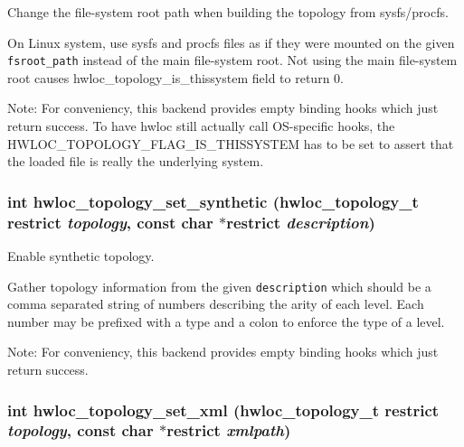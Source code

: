 Change the file-system root path when building the topology from sysfs/procfs. 

On Linux system, use sysfs and procfs files as if they were mounted on the given {\tt fsroot\_\-path} instead of the main file-system root. Not using the main file-system root causes hwloc\_\-topology\_\-is\_\-thissystem field to return 0.

\begin{Desc}
\item[Note:]For conveniency, this backend provides empty binding hooks which just return success. To have hwloc still actually call OS-specific hooks, the HWLOC\_\-TOPOLOGY\_\-FLAG\_\-IS\_\-THISSYSTEM has to be set to assert that the loaded file is really the underlying system. \end{Desc}
\hypertarget{group__hwlocality__configuration_g5c11f6e454ebd5f4089670269e097a1e}{
\subsubsection[{hwloc\_\-topology\_\-set\_\-synthetic}]{\setlength{\rightskip}{0pt plus 5cm}int hwloc\_\-topology\_\-set\_\-synthetic ({\bf hwloc\_\-topology\_\-t} restrict {\em topology}, \/  const char $\ast$restrict {\em description})}}
\label{group__hwlocality__configuration_g5c11f6e454ebd5f4089670269e097a1e}


Enable synthetic topology. 

Gather topology information from the given {\tt description} which should be a comma separated string of numbers describing the arity of each level. Each number may be prefixed with a type and a colon to enforce the type of a level.

\begin{Desc}
\item[Note:]For conveniency, this backend provides empty binding hooks which just return success. \end{Desc}
\hypertarget{group__hwlocality__configuration_g29b8ebec1b85b324af18fdf5040806bf}{
\subsubsection[{hwloc\_\-topology\_\-set\_\-xml}]{\setlength{\rightskip}{0pt plus 5cm}int hwloc\_\-topology\_\-set\_\-xml ({\bf hwloc\_\-topology\_\-t} restrict {\em topology}, \/  const char $\ast$restrict {\em xmlpath})}}
\label{group__hwlocality__configuration_g29b8ebec1b85b324af18fdf5040806bf}



